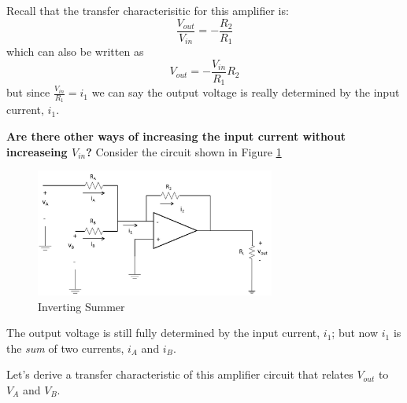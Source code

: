 \documentclass{handout}
\begin{document}
Recall that the transfer characterisitic for this amplifier is:
\begin{equation}
\frac{V_{out}}{V_{in}}=-\frac{R_2}{R_1}
\end{equation}
which can also be written as
\begin{equation}
V_{out}=-\frac{V_{in}}{R_1}R_2
\end{equation}
but since $\frac{V_{in}}{R_1} = i_1$ we can say the output voltage is really determined by the input current, $i_1$.

\textbf{Are there other ways of increasing the input current without increaseing $V_{in}$?}
Consider the circuit shown in Figure \ref{fig: InvertingSummer}
\begin{figure} [h!]
\centering
\includegraphics[width=0.7\textwidth]{InvertingSummer.jpg}
\caption{Inverting Summer}
\label{fig: InvertingSummer}
\end{figure}

The output voltage is still fully determined by the input current, $i_1$; but now $i_1$ is the {\em sum} of two currents, $i_A$ and $i_B$.

Let's derive a transfer characteristic of this amplifier circuit that relates $V_{out}$ to $V_A$ and $V_B$.

\end{document}
